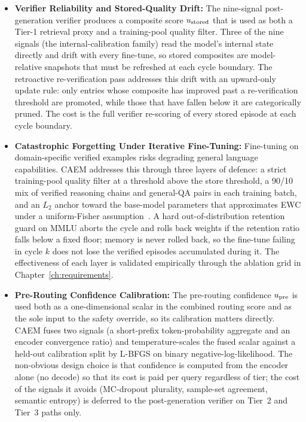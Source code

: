 \begin{itemize}
    \item \textbf{Verifier Reliability and Stored-Quality Drift:} The nine-signal post-generation verifier produces a composite score $u_{\text{stored}}$ that is used as both a Tier-1 retrieval proxy and a training-pool quality filter. Three of the nine signals (the internal-calibration family) read the model's internal state directly and drift with every fine-tune, so stored composites are model-relative snapshots that must be refreshed at each cycle boundary. The retroactive re-verification pass addresses this drift with an upward-only update rule: only entries whose composite has improved past a re-verification threshold are promoted, while those that have fallen below it are categorically pruned. The cost is the full verifier re-scoring of every stored episode at each cycle boundary.

    \item \textbf{Catastrophic Forgetting Under Iterative Fine-Tuning:} Fine-tuning on domain-specific verified examples risks degrading general language capabilities. CAEM addresses this through three layers of defence: a strict training-pool quality filter at a threshold above the store threshold, a 90/10 mix of verified reasoning chains and general-QA pairs in each training batch, and an $L_2$ anchor toward the base-model parameters that approximates EWC under a uniform-Fisher assumption~\cite{doi:10.1073/pnas.1611835114}. A hard out-of-distribution retention guard on MMLU aborts the cycle and rolls back weights if the retention ratio falls below a fixed floor; memory is never rolled back, so the fine-tune failing in cycle $k$ does not lose the verified episodes accumulated during it. The effectiveness of each layer is validated empirically through the ablation grid in Chapter~\ref{ch:requirements}.

    \item \textbf{Pre-Routing Confidence Calibration:} The pre-routing confidence $u_{\text{pre}}$ is used both as a one-dimensional scalar in the combined routing score and as the sole input to the safety override, so its calibration matters directly. CAEM fuses two signals (a short-prefix token-probability aggregate and an encoder convergence ratio) and temperature-scales the fused scalar against a held-out calibration split by L-BFGS on binary negative-log-likelihood. The non-obvious design choice is that confidence is computed from the encoder alone (no decode) so that its cost is paid per query regardless of tier; the cost of the signals it avoids (MC-dropout plurality, sample-set agreement, semantic entropy) is deferred to the post-generation verifier on Tier~2 and Tier~3 paths only.


\end{itemize}
